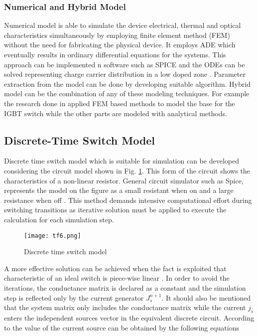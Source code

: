 \documentclass[journal]{IEEEtran}
\begin{document}
\subsubsection{Numerical and Hybrid Model}
Numerical model is able to simulate the device electrical, thermal and optical characteristics simultaneously by employing finite element method (FEM) without the need for fabricating the physical device. It employs ADE which eventually results in ordinary differential equations for the systems. This approach can be implemented n software such as SPICE and the ODEs can be solved representing charge carrier distribution in a low doped zone \cite{liang2017real}. Parameter extraction from the model can be done by developing suitable algorithm. Hybrid model can be the combination of any of these modeling techniques. For example the research done in \cite{sheng2000review} applied FEM based methods to model the base for the IGBT switch while the other parts are modeled with analytical methods.

\subsection{Discrete-Time Switch Model}
Discrete time switch model which is suitable for simulation can be developed considering the circuit model shown in Fig. \ref{fig:T6}. This form of the circuit shows the characteristics of a non-linear resistor. General circuit simulator such as Spice, represents the model on the figure as a small resistant when on and a large resistance when off \cite{pejovic1994method}. This method demands intensive computational effort during switching transitions as iterative solution must be applied to execute the calculation for each simulation step.

\begin{figure}[ht]
    \centering
    \texttt{[image: tf6.png]}
    \caption{Discrete time switch model \cite{pejovic1994method}}
    \label{fig:T6}
\end{figure}

A more effective solution can be achieved when the fact is exploited that characteristic of an ideal switch is piece-wise linear \cite{pejovic1994method}. In order to avoid the iterations, the conductance matrix is declared as a constant and the simulation step is reflected only by the current generator $J_{s}^{n+1}$. It should also be mentioned that the system matrix only includes the conductance matrix while the current $j_{s}$ enters the independent sources vector in the equivalent discrete circuit. According to \cite{pejovic1994method} the value of the current source can be obtained by the following equations
\end{document}
